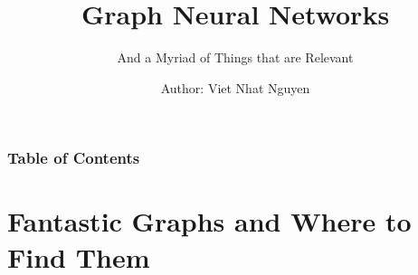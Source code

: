 \documentclass[
    11pt, %
    aspectratio=169, %
]{beamer}
\title[GNNs]{Graph Neural Networks}
\subtitle{And a Myriad of Things that are Relevant}
\author[nVn]{Author: Viet Nhat Nguyen}
\institute[]{University of Information Technology \\ \smallskip \textit{21520378@gm.uit.edu.vn}}
\date[Summer 2023]
\begin{document}
\section{}
\begin{frame}
	\titlepage %
 
\end{frame}


\begin{frame}
	\frametitle{Table of Contents} %
	
	\tableofcontents %
\end{frame}

\section{Fantastic Graphs and Where to Find Them} %

\end{document}
